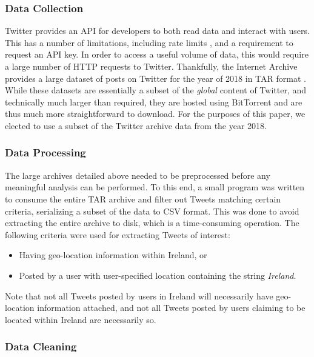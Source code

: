 \documentclass[a4paper,10pt]{article}
\begin{document}
    \subsubsection{Data Collection}

    Twitter provides an API for developers to both read data and interact with users. This has a number of limitations, including rate limits , and a requirement to request an API key. In order to access a useful volume of data, this would require a large number of HTTP requests to Twitter. Thankfully, the Internet Archive provides a large dataset of posts on Twitter for the year of 2018 in TAR format . While these datasets are essentially a subset of the \textit{global} content of Twitter, and technically much larger than required, they are hosted using BitTorrent and are thus much more straightforward to download. For the purposes of this paper, we elected to use a subset of the Twitter archive data from the year 2018.

    \subsubsection{Data Processing}

    The large archives detailed above needed to be preprocessed before any meaningful analysis can be performed. To this end, a small program was written to consume the entire TAR archive and filter out Tweets matching certain criteria, serializing a subset of the data to CSV format. This was done to avoid extracting the entire archive to disk, which is a time-consuming operation. The following criteria were used for extracting Tweets of interest:
    \begin{itemize}
        \item{
            Having geo-location information within Ireland, or
        }
        \item{
            Posted by a user with user-specified location containing the string \textit{Ireland}.
        }
    \end{itemize}

    Note that not all Tweets posted by users in Ireland will necessarily have geo-location information attached, and not all Tweets posted by users claiming to be located within Ireland are necessarily so.

    \subsubsection{Data Cleaning}
\end{document}

